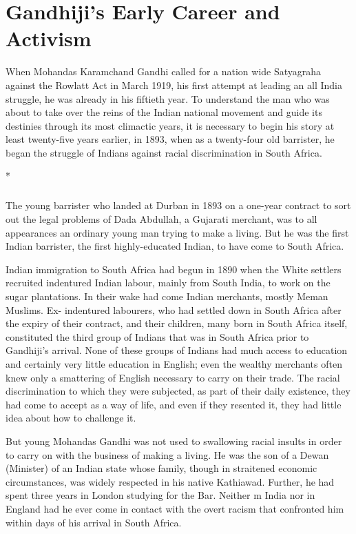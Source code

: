 \cleardoublepage
\chapter{Gandhiji's Early Career and Activism}

When Mohandas Karamchand Gandhi called for a nation­ wide Satyagraha against the Rowlatt Act in March 1919, his first attempt at leading an all India struggle, he was already in his fiftieth year. To understand the man who was about to take over the reins of the Indian national movement and guide its destinies through its most climactic years, it is necessary to begin his story at least twenty-five years earlier, in 1893, when as a twenty-four old barrister, he began the struggle of Indians against racial discrimination in South Africa.

\begin{center}*\end{center}

\paragraph*{}


The young barrister who landed at Durban in 1893 on a one-year contract to sort out the legal problems of Dada Abdullah, a Gujarati merchant, was to all appearances an ordinary young man trying to make a living. But he was the first Indian barrister, the first highly-educated Indian, to have come to South Africa.

Indian immigration to South Africa had begun in 1890 when the White settlers recruited indentured Indian labour, mainly from South India, to work on the sugar plantations. In their wake had come Indian merchants, mostly Meman Muslims. Ex- indentured labourers, who had settled down in South Africa after the expiry of their contract, and their children, many born in South Africa itself, constituted the third group of Indians that was in South Africa prior to Gandhiji's arrival. None of these groups of Indians had much access to education and certainly very little education in English; even the wealthy merchants often knew only a smattering of English necessary to carry on their trade. The racial discrimination to which they were subjected, as part of their daily existence, they had come to accept as a way of life, and even if they resented it, they had little idea about how to challenge it.

But young Mohandas Gandhi was not used to swallowing racial insults in order to carry on with the business of making a living. He was the son of a Dewan (Minister) of an Indian state whose family, though in straitened economic circumstances, was widely respected in his native Kathiawad. Further, he had spent three years in London studying for the Bar. Neither m India nor in England had he ever come in contact with the overt racism that confronted him within days of his arrival in South Africa.

